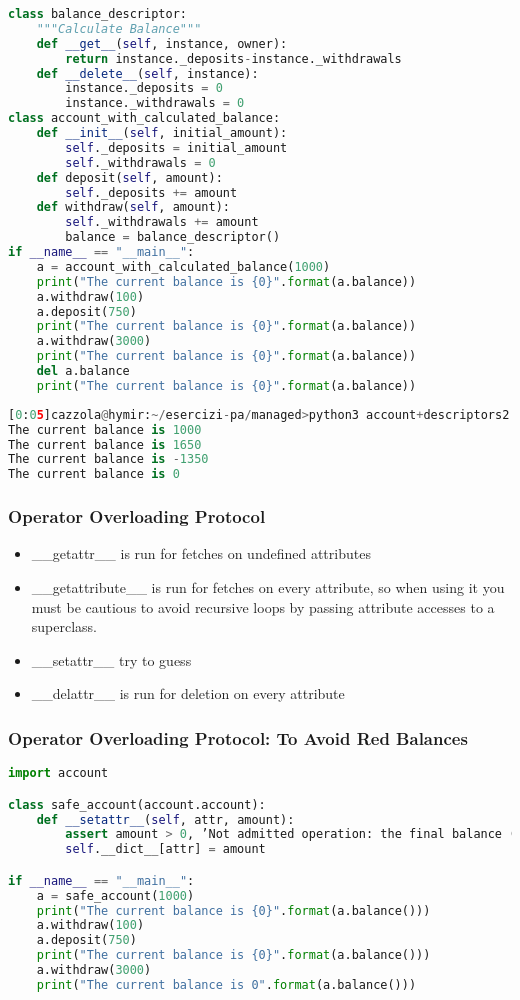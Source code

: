 \begin{lstlisting}[language=Python]
class balance_descriptor:
	"""Calculate Balance"""
	def __get__(self, instance, owner):
		return instance._deposits-instance._withdrawals
	def __delete__(self, instance):
		instance._deposits = 0
		instance._withdrawals = 0
class account_with_calculated_balance:
	def __init__(self, initial_amount):
		self._deposits = initial_amount
		self._withdrawals = 0
	def deposit(self, amount):
		self._deposits += amount
	def withdraw(self, amount):
		self._withdrawals += amount
		balance = balance_descriptor()
if __name__ == "__main__":
	a = account_with_calculated_balance(1000)
	print("The current balance is {0}".format(a.balance))
	a.withdraw(100)
	a.deposit(750)
	print("The current balance is {0}".format(a.balance))
	a.withdraw(3000)
	print("The current balance is {0}".format(a.balance))
	del a.balance
	print("The current balance is {0}".format(a.balance))
\end{lstlisting}

\begin{lstlisting}[language=Python]
[0:05]cazzola@hymir:~/esercizi-pa/managed>python3 account+descriptors2.py
The current balance is 1000
The current balance is 1650
The current balance is -1350
The current balance is 0
\end{lstlisting}

\subsubsection{Operator Overloading Protocol}

\begin{itemize}
	\item \_\_getattr\_\_ is run for fetches on undefined attributes
	\item \_\_getattribute\_\_ is run for fetches on every attribute, so when using it you must be cautious to avoid recursive loops by passing attribute accesses to a superclass.
	\item \_\_setattr\_\_ try to guess
	\item \_\_delattr\_\_ is run for deletion on every attribute
\end{itemize}

\subsubsection{Operator Overloading Protocol: To Avoid Red Balances}

\begin{lstlisting}[language=Python]
import account

class safe_account(account.account):
	def __setattr__(self, attr, amount):
		assert amount > 0, ’Not admitted operation: the final balance ({0}) MUST be positive’.format(amount)
		self.__dict__[attr] = amount

if __name__ == "__main__":
	a = safe_account(1000)
	print("The current balance is {0}".format(a.balance()))
	a.withdraw(100)
	a.deposit(750)
	print("The current balance is {0}".format(a.balance()))
	a.withdraw(3000)
	print("The current balance is 0".format(a.balance()))
\end{lstlisting}

